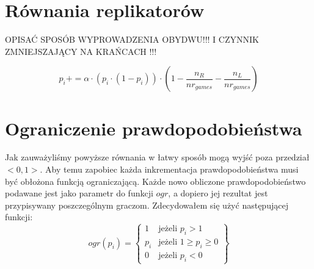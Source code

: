 
\section{Równania replikatorów}
\label{sec:r_repli}

OPISAĆ SPOSÓB WYPROWADZENIA OBYDWU!!! I CZYNNIK ZMNIEJSZAJĄCY NA KRAŃCACH !!!

\begin{equation} \label{eq:repli}
p_i += \alpha \cdot (p_i \cdot (1 - p_i)) \cdot (1 - \frac{n_R}{nr_{games}} - \frac{n_L}{nr_{games}})
\end{equation}


\section{Ograniczenie prawdopodobieństwa}
\label{sec:ograniczenie}
Jak zauważyliśmy powyższe równania w łatwy sposób mogą wyjść poza przedział $<0,1>$. Aby temu zapobiec każda inkrementacja prawdopodobieństwa musi być obłożona funkcją ograniczającą. Każde nowo obliczone prawdopodobieństwo podawane jest jako parametr do funkcji $ogr$, a dopiero jej rezultat jest przypisywany poszczególnym graczom. Zdecydowałem się użyć następującej funkcji:
\begin{displaymath}
ogr(p_i) = \left\{
\begin{array}{ll}
1 & \text{jeżeli } p_i > 1 \\
p_i & \text{jeżeli } 1 \geq p_i \geq 0 \\
0 & \text{jeżeli } p_i < 0
\end{array} 
\right\}
\end{displaymath}

